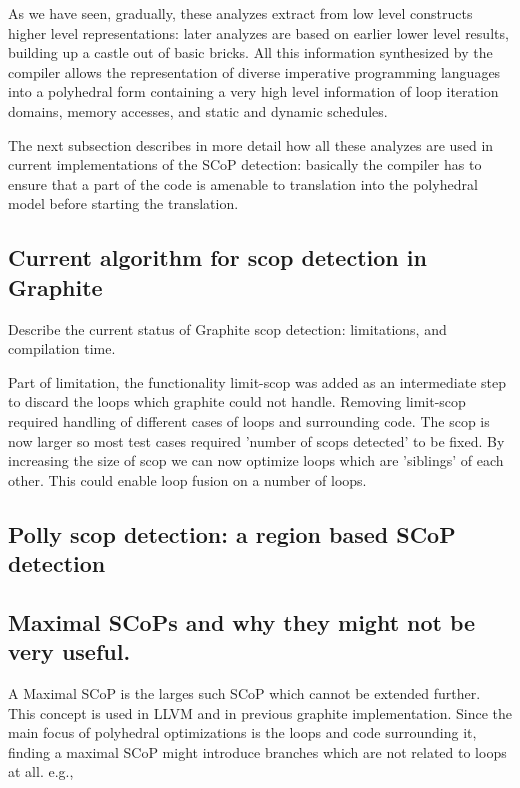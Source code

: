 \documentclass{sigplanconf}
\begin{document}
As we have seen, gradually, these analyzes extract from low level constructs
higher level representations: later analyzes are based on earlier lower level
results, building up a castle out of basic bricks.  All this information
synthesized by the compiler allows the representation of diverse imperative
programming languages into a polyhedral form \cite{} containing a very high
level information of loop iteration domains, memory accesses, and static and
dynamic schedules.

The next subsection describes in more detail how all these analyzes are used in
current implementations of the SCoP detection: basically the compiler has to
ensure that a part of the code is amenable to translation into the polyhedral
model before starting the translation.

\subsection{Current algorithm for scop detection in Graphite}

Describe the current status of Graphite scop detection: limitations, and compilation time.

Part of limitation, the functionality limit-scop was added as an intermediate
step to discard the loops which graphite could not handle. Removing limit-scop
required handling of different cases of loops and surrounding code.  The scop is
now larger so most test cases required 'number of scops detected' to be
fixed. By increasing the size of scop we can now optimize loops which are
'siblings' of each other. This could enable loop fusion on a number of loops.

\subsection{Polly scop detection: a region based SCoP detection}

\subsection{Maximal SCoPs and why they might not be very useful.}
A Maximal SCoP is the larges such SCoP which cannot be extended further. This concept is used
in LLVM 
and in previous graphite implementation.
Since the main focus of
polyhedral optimizations is the loops and code surrounding it, finding a maximal SCoP might introduce branches
which are not related to loops at all. e.g.,
\end{document}
